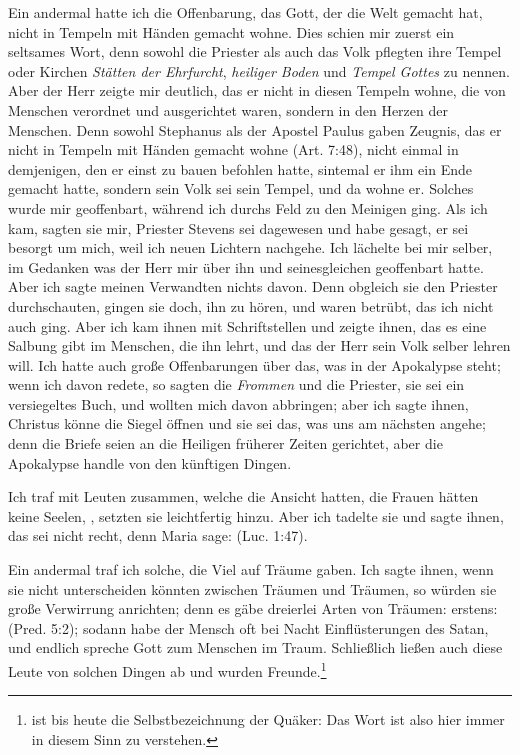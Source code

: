 Ein andermal hatte ich die Offenbarung, 
das Gott, der die
Welt gemacht hat, nicht in Tempeln mit Händen gemacht wohne.
Dies schien mir zuerst ein seltsames Wort, denn sowohl die
Priester als auch das Volk pflegten ihre Tempel oder Kirchen
\textit{Stätten der Ehrfurcht}, \textit{heiliger Boden} und \textit{Tempel Gottes}
zu nennen. Aber der Herr zeigte mir deutlich, das er nicht
in diesen Tempeln wohne, die von Menschen verordnet und
ausgerichtet waren, sondern in den Herzen der Menschen. Denn
sowohl Stephanus als der Apostel Paulus gaben Zeugnis,
das er nicht in Tempeln mit Händen gemacht wohne 
(Art. 7:48),
nicht einmal in demjenigen, den er einst zu bauen befohlen hatte,
sintemal er ihm ein Ende gemacht hatte, sondern sein Volk sei
sein Tempel, und da wohne er. Solches wurde mir geoffenbart,
während ich durchs Feld zu den Meinigen ging. Als ich kam,
sagten sie mir, Priester Stevens sei dagewesen und habe gesagt,
er sei besorgt um mich, weil ich neuen Lichtern nachgehe. Ich
lächelte bei mir selber, im Gedanken was der Herr mir über ihn
und seinesgleichen geoffenbart hatte. Aber ich sagte meinen 
Verwandten nichts davon. Denn obgleich sie den Priester durchschauten, 
gingen sie doch, ihn zu hören, und waren betrübt, das
ich nicht auch ging. Aber ich kam ihnen mit Schriftstellen und
zeigte ihnen, das es eine Salbung gibt im Menschen, die ihn
lehrt, und das der Herr sein Volk selber lehren will. Ich hatte
auch große Offenbarungen über das, was in der 
Apokalypse steht;
wenn ich davon redete, so sagten die \textit{Frommen} und die Priester,
sie sei ein versiegeltes Buch, und wollten mich davon abbringen;
aber ich sagte ihnen, Christus könne die Siegel öffnen und sie
sei das, was uns am nächsten angehe; denn die Briefe seien an
die Heiligen früherer Zeiten gerichtet, aber die Apokalypse handle
von den künftigen Dingen.

Ich traf mit Leuten zusammen, welche die Ansicht hatten,
die Frauen hätten keine Seelen, ,
setzten sie leichtfertig hinzu. Aber ich tadelte sie und sagte ihnen,
das sei nicht recht, denn Maria sage:  
(Luc. 1:47).

Ein andermal traf ich solche, die Viel auf Träume gaben.
Ich sagte ihnen, wenn sie nicht unterscheiden könnten zwischen
Träumen und Träumen, so würden sie große Verwirrung anrichten; 
denn es gäbe dreierlei Arten von Träumen: erstens:
(Pred. 5:2); sodann habe der
Mensch oft bei Nacht Einflüsterungen des Satan, 
und endlich
spreche Gott zum Menschen im Traum. Schließlich ließen auch
diese Leute von solchen Dingen ab und wurden Freunde.\footnote{ 
ist bis heute die Selbstbezeichnung der Quäker: Das Wort
 ist also hier immer in diesem Sinn zu verstehen.}

